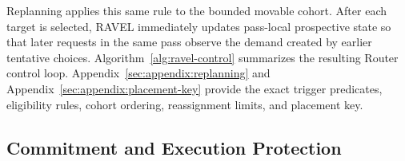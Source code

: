 Replanning applies this same rule to the bounded movable cohort.
After each target is selected, RAVEL immediately updates pass-local
prospective state so that later requests in the same pass observe the demand
created by earlier tentative choices.
Algorithm~\ref{alg:ravel-control} summarizes the resulting Router control loop.
Appendix~\ref{sec:appendix:replanning} and
Appendix~\ref{sec:appendix:placement-key} provide the exact trigger predicates,
eligibility rules, cohort ordering, reassignment limits, and placement key.


\begin{algorithm}[t]
\caption{\textsc{RAVEL} Router Control Loop}
\label{alg:ravel-control}
\small


\BlankLine


\BlankLine

\end{algorithm}


\subsection{Commitment and Execution Protection}
\label{sec:design:commitment}

